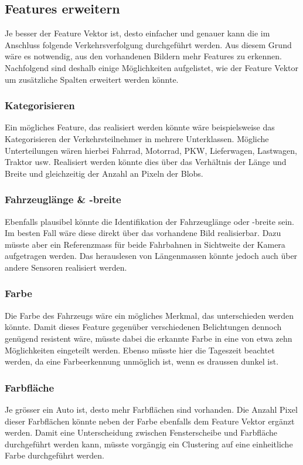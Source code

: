 \subsection{Features erweitern}
Je besser der Feature Vektor ist, desto einfacher und genauer kann die im Anschluss folgende Verkehrsverfolgung durchgeführt werden. Aus diesem Grund wäre es notwendig, aus den vorhandenen Bildern mehr Features zu erkennen. Nachfolgend sind deshalb einige Möglichkeiten aufgelistet, wie der Feature Vektor um zusätzliche Spalten erweitert werden könnte.

\subsubsection{Kategorisieren}
Ein mögliches Feature, das realisiert werden könnte wäre beispielsweise das Kategorisieren der Verkehrsteilnehmer in mehrere Unterklassen. Mögliche Unterteilungen wären hierbei Fahrrad, Motorrad, PKW, Lieferwagen, Lastwagen, Traktor usw. Realisiert werden könnte dies über das Verhältnis der Länge und Breite und gleichzeitig der Anzahl an Pixeln der Blobs.

\subsubsection{Fahrzeuglänge \& -breite}
Ebenfalls plausibel könnte die Identifikation der Fahrzeuglänge oder -breite sein. Im besten Fall wäre diese direkt über das vorhandene Bild realisierbar. Dazu müsste aber ein Referenzmass für beide Fahrbahnen in Sichtweite der Kamera aufgetragen werden. Das herauslesen von Längenmassen könnte jedoch auch über andere Sensoren realisiert werden.

\subsubsection{Farbe}
Die Farbe des Fahrzeugs wäre ein mögliches Merkmal, das unterschieden werden könnte. Damit dieses Feature gegenüber verschiedenen Belichtungen dennoch genügend resistent wäre, müsste dabei die erkannte Farbe in eine von etwa zehn Möglichkeiten eingeteilt werden. Ebenso müsste hier die Tageszeit beachtet werden, da eine Farbeerkennung unmöglich ist, wenn es draussen dunkel ist.

\subsubsection{Farbfläche}
Je grösser ein Auto ist, desto mehr Farbflächen sind vorhanden. Die Anzahl Pixel dieser Farbflächen könnte neben der Farbe ebenfalls dem Feature Vektor ergänzt werden. Damit eine Unterscheidung zwischen Fensterscheibe und Farbfläche durchgeführt werden kann, müsste vorgängig ein Clustering auf eine einheitliche Farbe durchgeführt werden.


